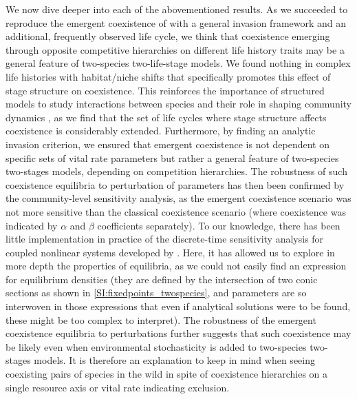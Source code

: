 \documentclass{article}
\begin{document}
We now dive deeper into each of the abovementioned results. As we succeeded to reproduce the emergent coexistence of \citet{moll2008competition} with a general invasion framework and an additional, frequently observed life cycle, we think that coexistence emerging through opposite competitive hierarchies on different life history traits may be a general feature of two-species two-life-stage models. We found nothing in complex life histories with habitat/niche shifts that specifically promotes this effect of stage structure on coexistence. This reinforces the importance of structured models to study interactions between species and their role in shaping community dynamics \citep{miller2011thinking}, as we find that the set of life cycles where stage structure affects coexistence is considerably extended. Furthermore, by finding an analytic invasion criterion, we ensured that emergent coexistence is not dependent on specific sets of vital rate parameters but rather a general feature of two-species two-stages models, depending on competition hierarchies.  The robustness of such coexistence equilibria to perturbation of parameters has then been confirmed by the community-level sensitivity analysis, as the emergent coexistence scenario was not more sensitive than the classical coexistence scenario (where coexistence was indicated by $\alpha$ and $\beta$ coefficients separately). To our knowledge, there has been little implementation in practice of the discrete-time sensitivity analysis for coupled nonlinear systems developed by \citet{barabas2014fixed}. Here, it has allowed us to explore in more depth the properties of equilibria, as we could not easily find an expression for equilibrium densities (they are defined by the intersection of two conic sections as shown in \ref{SI:fixedpoints_twospecies}, and parameters are so interwoven in those expressions that even if analytical solutions were to be found, these might be too complex to interpret).
The robustness of the emergent coexistence equilibria to perturbations further suggests that such coexistence may be likely even when environmental stochasticity is added to two-species two-stages models. It is therefore an explanation to keep in mind when seeing coexisting pairs of species in the wild in spite of coexistence hierarchies on a single resource axis or vital rate indicating exclusion. 
\end{document}
